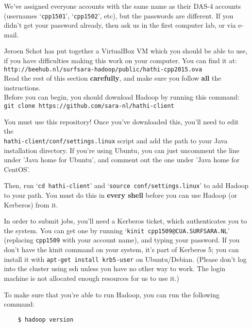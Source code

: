 \documentclass[a4paper,11pt]{article}
\begin{document}
  We've assigned everyone accounts with the same name as their DAS-4 accounts (usernames `\texttt{cpp1501}', `\texttt{cpp1502}', etc), but the passwords
  are different. If you didn't get your password already, then ask us in the first computer lab, or via e-mail.

  Jeroen Schot has put together a VirtualBox VM which you should be able to use, if you have difficulties making this work on your computer.
  You can find it at: \\ \texttt{http://beehub.nl/surfsara-hadoop/public/hathi-cpp2015.ova} \\

  Read the rest of this section \textbf{carefully}, and make sure you follow \textbf{all} the instructions. \\

  Before you can begin, you should download Hadoop by running this command:\\
  \texttt{git clone https://github.com/sara-nl/hathi-client}

  You must use this repository! Once you've downloaded this, you'll need to edit the \\ \texttt{hathi-client/conf/settings.linux} script
  and add the path to your Java installation directory. If you're using Ubuntu, you can just uncomment
  the line under 'Java home for Ubuntu', and comment out the one under 'Java home for CentOS'.

  Then, run `\texttt{cd hathi-client}' and `\texttt{source conf/settings.linux}' to add Hadoop
  to your path. You must do this in \textbf{every shell} before you can use Hadoop (or Kerberos) from it.
  
  In order to submit jobs, you'll need a Kerberos ticket, which authenticates you to the system. You can get one by running
  `\texttt{kinit cpp1509@CUA.SURFSARA.NL}' (replacing \texttt{cpp1509} with your account name), and typing your password. If you don't have the kinit
  command on your system, it's part of Kerberos 5; you can install it with \texttt{apt-get install krb5-user} on Ubuntu/Debian.
  (Please don't log into the cluster using ssh unless you have no other way to work. The login machine is not allocated enough resources
  for us to use it.)

  To make sure that you're able to run Hadoop, you can run the following command: 
  
  \lstset{language=}
  
  \begin{lstlisting}
    $ hadoop version
  \end{lstlisting}
  
\end{document}
